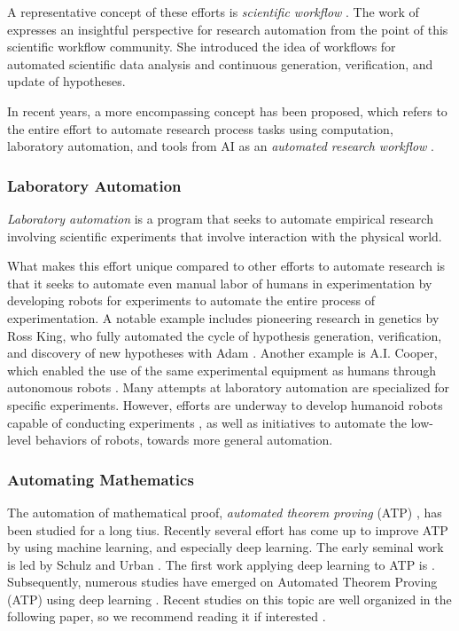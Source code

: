 A representative concept of these efforts is \textit{scientific workflow} \cite{ludascher2009scientific}. The work of \cite{gil2022will} expresses an insightful perspective for research automation from the point of this scientific workflow community. She introduced the idea of workflows for automated scientific data analysis and continuous generation, verification, and update of hypotheses. 

In recent years, a more encompassing concept has been proposed, which refers to the entire effort to automate research process tasks using computation, laboratory automation, and tools from AI as an \textit{automated research workflow} \cite{national2022automated}. 

\subsubsection{Laboratory Automation}
\textit{Laboratory automation} is a program that seeks to automate empirical research involving scientific experiments that involve interaction with the physical world.

What makes this effort unique compared to other efforts to automate research is that it seeks to automate even manual labor of humans in experimentation by developing robots for experiments to automate the entire process of experimentation. A notable example includes pioneering research in genetics by Ross King, who fully automated the cycle of hypothesis generation, verification, and discovery of new hypotheses with Adam \cite{king2004functional}. Another example is A.I. Cooper, which enabled the use of the same experimental equipment as humans through autonomous robots \cite{burger2020mobile}. Many attempts at laboratory automation are specialized for specific experiments. However, efforts are underway to develop humanoid robots capable of conducting experiments \cite{yachie2017robotic}, as well as initiatives to automate the low-level behaviors of robots, towards more general automation.



\subsubsection{Automating Mathematics}
The automation of mathematical proof, \textit{automated theorem proving} (ATP) , has been studied for a long tius. Recently several effort has come up to improve ATP by using machine learning, and especially deep learning. The early seminal work is led by Schulz \cite{schulz2001learning} and Urban \cite{urban2004mptp,urban2008malarea}. The first work applying deep learning to ATP is \cite{irving2016deepmath}. Subsequently, numerous studies have emerged on Automated Theorem Proving (ATP) using deep learning \cite{bansal2019holist}. Recent studies on this topic are well organized in the following paper, so we recommend reading it if interested \cite{rabe2021towards}.

